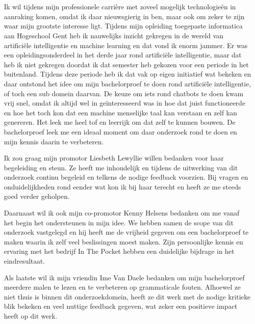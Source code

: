 
\chapter*{}
\label{ch:voorwoord}


Ik wil tijdens mijn professionele carrière met zoveel mogelijk technologieën in aanraking komen, omdat ik daar nieuwsgierig in ben, maar ook om zeker te zijn waar mijn grootste interesse ligt. Tijdens mijn opleiding toegepaste informatica aan Hogeschool Gent heb ik nauwelijks inzicht gekregen in de wereld van artificiële intelligentie en machine learning en dat vond ik enorm jammer. Er was een opleidingsonderdeel in het derde jaar rond artificiële intelligentie, maar dat heb ik niet gekregen doordat ik dat semester heb gekozen voor een periode in het buitenland. Tijdens deze periode heb ik dat vak op eigen initiatief wat bekeken en daar ontstond het idee om mijn bachelorproef te doen rond artificiële intelligentie, of toch een sub domein daarvan. De keuze om iets rond chatbots te doen kwam vrij snel, omdat ik altijd wel in geïnteresseerd was in hoe dat juist functioneerde en hoe het toch kon dat een machine menselijke taal kan verstaan en zelf kan genereren. Het leek me heel tof en leerrijk om dat zelf te kunnen bouwen. De bachelorproef leek me een ideaal moment om daar onderzoek rond te doen en mijn kennis daarin te verbeteren.

Ik zou graag mijn promotor Liesbeth Lewyllie willen bedanken voor haar begeleiding en steun. Ze heeft me inhoudelijk en tijdens de uitwerking van dit onderzoek continu begeleid en telkens de nodige feedback voorzien. Bij vragen en onduidelijkheden rond eender wat kon ik bij haar terecht en heeft ze me steeds goed verder geholpen.

Daarnaast wil ik ook mijn co-promotor Kenny Helsens bedanken om me vanaf het begin het ondersteunen in mijn idee. We hebben samen de scope van dit onderzoek vastgelegd en hij heeft me de vrijheid gegeven om een bachelorproef te maken waarin ik zelf veel beslissingen moest maken. Zijn persoonlijke kennis en ervaring met het bedrijf In The Pocket hebben een duidelijke bijdrage in het eindresultaat.

Als laatste wil ik mijn vriendin Ime Van Daele bedanken om mijn bachelorproef meerdere malen te lezen en te verbeteren op grammaticale fouten. Alhoewel ze niet thuis is binnen dit onderzoekdomein, heeft ze dit werk met de nodige kritieke blik bekeken en veel nuttige feedback gegeven, wat zeker een positieve impact heeft op dit werk.
